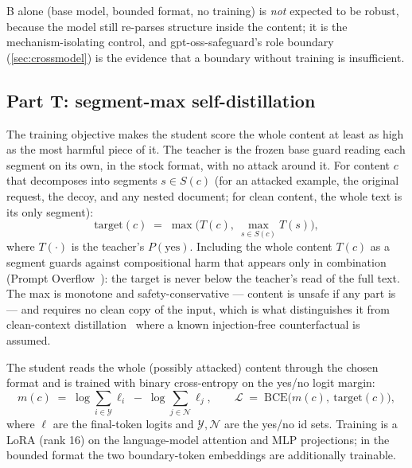 B alone (base model, bounded format, no training) is \emph{not} expected to be robust, because the model still re-parses structure inside the content; it is the mechanism-isolating control, and gpt-oss-safeguard's role boundary (\cref{sec:crossmodel}) is the evidence that a boundary without training is insufficient.

\subsection{Part T: segment-max self-distillation}
\label{sec:fixT}

The training objective makes the student score the whole content at least as high as the most harmful piece of it.
The teacher is the frozen base guard reading each segment on its own, in the stock format, with no attack around it.
For content $c$ that decomposes into segments $s \in S(c)$ (for an attacked example, the original request, the decoy, and any nested document; for clean content, the whole text is its only segment):
\begin{equation}
  \text{target}(c) \;=\; \max\!\Big(T(c),\ \max_{s \in S(c)} T(s)\Big),
  \label{eq:target}
\end{equation}
where $T(\cdot)$ is the teacher's $P(\text{yes})$. %
Including the whole content $T(c)$ as a segment guards against compositional harm that appears only in combination (Prompt Overflow~\citep{zhou2026prompt}): the target is never below the teacher's read of the full text.
The max is monotone and safety-conservative --- content is unsafe if any part is --- and requires no clean copy of the input, which is what distinguishes it from clean-context distillation~\citep{peng2026secopd,dhouib2026raised} where a known injection-free counterfactual is assumed.

The student reads the whole (possibly attacked) content through the chosen format and is trained with binary cross-entropy on the yes/no logit margin:
\begin{equation}
  m(c) \;=\; \log\!\!\sum_{i \in \mathcal{Y}} \ell_i \;-\; \log\!\!\sum_{j \in \mathcal{N}} \ell_j,
  \qquad
  \mathcal{L} \;=\; \text{BCE}\big(m(c),\ \text{target}(c)\big),
  \label{eq:loss}
\end{equation}
where $\ell$ are the final-token logits and $\mathcal{Y}, \mathcal{N}$ are the yes/no id sets. %
Training is a LoRA (rank 16) on the language-model attention and MLP projections; in the bounded format the two boundary-token embeddings are additionally trainable. %

